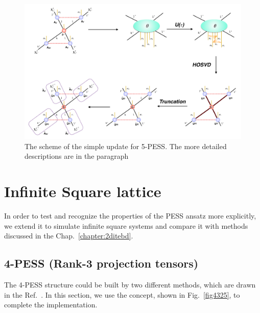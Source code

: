 \begin{figure}[ht]
	\centering
	\includegraphics[width=1.00\textwidth]{figures/fig4324.png}
	\caption[The scheme of the simple update for 5-PESS.]{The scheme of the simple update for 5-PESS. The more detailed descriptions are in the paragraph}
	\label{fig4324}
\end{figure}
\section{Infinite Square lattice}
\label{4pess2b}
In order to test and recognize the properties of the PESS ansatz more explicitly, we extend it to simulate infinite square systems and compare it with methods discussed in the Chap.~\ref{chapter:2ditebd}.

\subsection{4-PESS (Rank-3 projection tensors)}
The 4-PESS structure could be built by two different methods, which are drawn in the Ref.~\cite{PhysRevX.4.011025}. In this section, we use the concept, shown in Fig.~\ref{fig4325}, to complete the implementation. 

